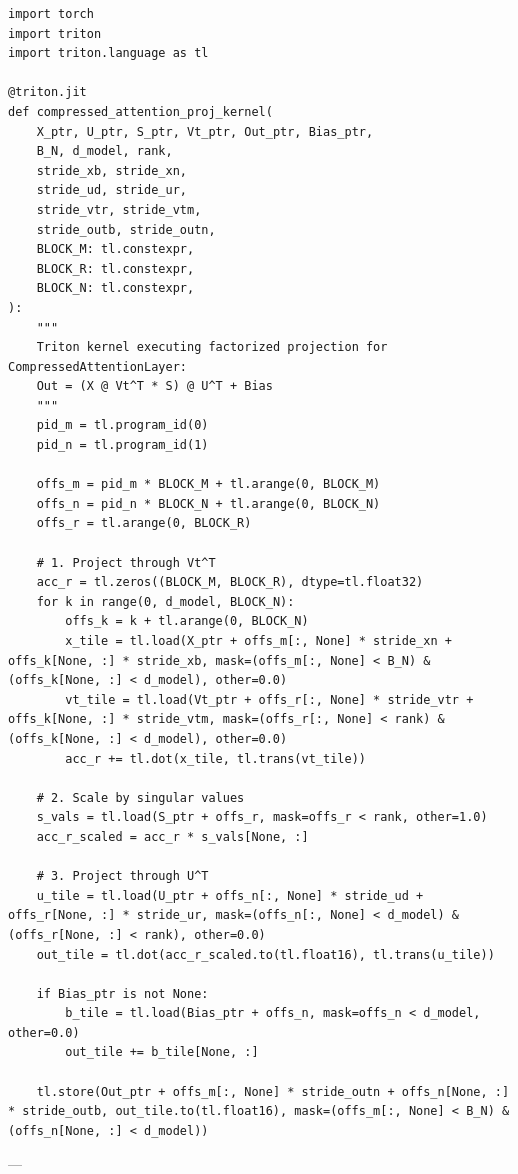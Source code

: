\begin{lstlisting}
import torch
import triton
import triton.language as tl

@triton.jit
def compressed_attention_proj_kernel(
    X_ptr, U_ptr, S_ptr, Vt_ptr, Out_ptr, Bias_ptr,
    B_N, d_model, rank,
    stride_xb, stride_xn,
    stride_ud, stride_ur,
    stride_vtr, stride_vtm,
    stride_outb, stride_outn,
    BLOCK_M: tl.constexpr,
    BLOCK_R: tl.constexpr,
    BLOCK_N: tl.constexpr,
):
    """
    Triton kernel executing factorized projection for CompressedAttentionLayer:
    Out = (X @ Vt^T * S) @ U^T + Bias
    """
    pid_m = tl.program_id(0)
    pid_n = tl.program_id(1)

    offs_m = pid_m * BLOCK_M + tl.arange(0, BLOCK_M)
    offs_n = pid_n * BLOCK_N + tl.arange(0, BLOCK_N)
    offs_r = tl.arange(0, BLOCK_R)

    # 1. Project through Vt^T
    acc_r = tl.zeros((BLOCK_M, BLOCK_R), dtype=tl.float32)
    for k in range(0, d_model, BLOCK_N):
        offs_k = k + tl.arange(0, BLOCK_N)
        x_tile = tl.load(X_ptr + offs_m[:, None] * stride_xn + offs_k[None, :] * stride_xb, mask=(offs_m[:, None] < B_N) & (offs_k[None, :] < d_model), other=0.0)
        vt_tile = tl.load(Vt_ptr + offs_r[:, None] * stride_vtr + offs_k[None, :] * stride_vtm, mask=(offs_r[:, None] < rank) & (offs_k[None, :] < d_model), other=0.0)
        acc_r += tl.dot(x_tile, tl.trans(vt_tile))

    # 2. Scale by singular values
    s_vals = tl.load(S_ptr + offs_r, mask=offs_r < rank, other=1.0)
    acc_r_scaled = acc_r * s_vals[None, :]

    # 3. Project through U^T
    u_tile = tl.load(U_ptr + offs_n[:, None] * stride_ud + offs_r[None, :] * stride_ur, mask=(offs_n[:, None] < d_model) & (offs_r[None, :] < rank), other=0.0)
    out_tile = tl.dot(acc_r_scaled.to(tl.float16), tl.trans(u_tile))

    if Bias_ptr is not None:
        b_tile = tl.load(Bias_ptr + offs_n, mask=offs_n < d_model, other=0.0)
        out_tile += b_tile[None, :]

    tl.store(Out_ptr + offs_m[:, None] * stride_outn + offs_n[None, :] * stride_outb, out_tile.to(tl.float16), mask=(offs_m[:, None] < B_N) & (offs_n[None, :] < d_model))
\end{lstlisting}


---
